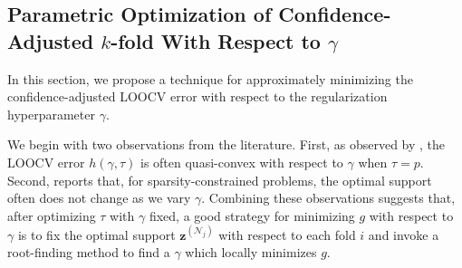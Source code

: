 \documentclass[mnsc,nonblindrev]{informs3} %
\let\footnote=\endnote
\begin{document}

\subsection{Parametric Optimization of Confidence-Adjusted $k$-fold With Respect to $\gamma$} \label{ssec:parametric2}
In this section, we propose a technique for approximately minimizing the confidence-adjusted LOOCV error with respect to the regularization hyperparameter $\gamma$. 

We begin with two observations from the literature. First, as observed by \cite{stephenson2021can}, the LOOCV error $h(\gamma,\tau)$ is often quasi-convex with respect to $\gamma$ when $\tau=p$. Second, \cite{bertsimas2021unified, bertsimas2022scalable} reports that, for sparsity-constrained problems, the optimal support often does not change as we vary $\gamma$. Combining these observations suggests that, after optimizing $\tau$ with $\gamma$ fixed, a good strategy for minimizing $g$ with respect to $\gamma$ is to fix the optimal support $\bm{z}^{(\mathcal{N}_j)}$ with respect to each fold $i$ and invoke a root-finding method to find a $\gamma$ which locally minimizes %
$g$.
\end{document}

